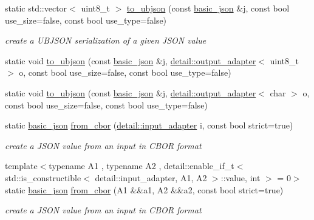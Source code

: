 \begin{DoxyCompactItemize}
static std\+::vector$<$ uint8\+\_\+t $>$ \hyperlink{classnlohmann_1_1basic__json_ae1ece6c2059114eac10873f13ef19185}{to\+\_\+ubjson} (const \hyperlink{classnlohmann_1_1basic__json}{basic\+\_\+json} \&j, const bool use\+\_\+size=false, const bool use\+\_\+type=false)
\begin{DoxyCompactList}\small\item\em create a U\+B\+J\+S\+ON serialization of a given J\+S\+ON value \end{DoxyCompactList}\item 
static void \hyperlink{classnlohmann_1_1basic__json_a480f6d5a30b9627b55831178266575a7}{to\+\_\+ubjson} (const \hyperlink{classnlohmann_1_1basic__json}{basic\+\_\+json} \&j, \hyperlink{classnlohmann_1_1detail_1_1output__adapter}{detail\+::output\+\_\+adapter}$<$ uint8\+\_\+t $>$ o, const bool use\+\_\+size=false, const bool use\+\_\+type=false)
\item 
static void \hyperlink{classnlohmann_1_1basic__json_af66db22ad819346a688042a9da68ee5f}{to\+\_\+ubjson} (const \hyperlink{classnlohmann_1_1basic__json}{basic\+\_\+json} \&j, \hyperlink{classnlohmann_1_1detail_1_1output__adapter}{detail\+::output\+\_\+adapter}$<$ char $>$ o, const bool use\+\_\+size=false, const bool use\+\_\+type=false)
\item 
static \hyperlink{classnlohmann_1_1basic__json}{basic\+\_\+json} \hyperlink{classnlohmann_1_1basic__json_aa9be366b887378bb10c0f1ab510c2f0c}{from\+\_\+cbor} (\hyperlink{classnlohmann_1_1detail_1_1input__adapter}{detail\+::input\+\_\+adapter} i, const bool strict=true)
\begin{DoxyCompactList}\small\item\em create a J\+S\+ON value from an input in C\+B\+OR format \end{DoxyCompactList}\item 
{\footnotesize template$<$typename A1 , typename A2 , detail\+::enable\+\_\+if\+\_\+t$<$ std\+::is\+\_\+constructible$<$ detail\+::input\+\_\+adapter, A1, A2 $>$\+::value, int $>$  = 0$>$ }\\static \hyperlink{classnlohmann_1_1basic__json}{basic\+\_\+json} \hyperlink{classnlohmann_1_1basic__json_abc2393a8ce91f2cd25bc1c2ca96daf24}{from\+\_\+cbor} (A1 \&\&a1, A2 \&\&a2, const bool strict=true)
\begin{DoxyCompactList}\small\item\em create a J\+S\+ON value from an input in C\+B\+OR format \end{DoxyCompactList}\item 

\end{DoxyCompactItemize}
